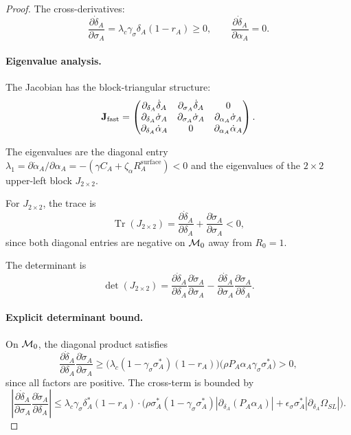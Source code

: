 \begin{proof}
The cross-derivatives:
\[
\frac{\partial \dot{\delta}_A}{\partial \sigma_A}
= \lambda_c \gamma_\sigma \delta_A (1 - r_A) \geq 0,
\qquad
\frac{\partial \dot{\delta}_A}{\partial \alpha_A} = 0.
\]

\paragraph{Eigenvalue analysis.}
The Jacobian has the block-triangular structure:
\[
\mathbf{J}_{\mathrm{fast}} =
\begin{pmatrix}
\partial_{\delta_A} \dot{\delta}_A & \partial_{\sigma_A} \dot{\delta}_A & 0 \\
\partial_{\delta_A} \dot{\sigma}_A & \partial_{\sigma_A} \dot{\sigma}_A & \partial_{\alpha_A} \dot{\sigma}_A \\
\partial_{\delta_A} \dot{\alpha}_A & 0 & \partial_{\alpha_A} \dot{\alpha}_A
\end{pmatrix}.
\]

The eigenvalues are the diagonal entry $\lambda_1 = \partial \dot{\alpha}_A / \partial \alpha_A = -(\gamma C_A + \zeta_\alpha R_A^{\mathrm{surface}}) < 0$ and the eigenvalues of the $2 \times 2$ upper-left block $J_{2\times2}$.

For $J_{2\times2}$, the trace is
\[
\operatorname{Tr}(J_{2\times2})
= \frac{\partial \dot{\delta}_A}{\partial \delta_A}
+ \frac{\partial \dot{\sigma}_A}{\partial \sigma_A} < 0,
\]
since both diagonal entries are negative on $\mathcal{M}_0$ away from $R_0=1$.

The determinant is
\[
\det(J_{2\times2})
= \frac{\partial \dot{\delta}_A}{\partial \delta_A}
   \frac{\partial \dot{\sigma}_A}{\partial \sigma_A}
 - \frac{\partial \dot{\delta}_A}{\partial \sigma_A}
   \frac{\partial \dot{\sigma}_A}{\partial \delta_A}.
\]

\paragraph{Explicit determinant bound.}
On $\mathcal{M}_0$, the diagonal product satisfies
\[
\frac{\partial \dot{\delta}_A}{\partial \delta_A}
\frac{\partial \dot{\sigma}_A}{\partial \sigma_A}
\geq \bigl(\lambda_c (1 - \gamma_\sigma \sigma_A^*)(1 - r_A) \bigr)
      \bigl(\rho P_A \alpha_A \gamma_\sigma \sigma_A^* \bigr)
> 0,
\]
since all factors are positive. The cross-term is bounded by
\[
\left|\frac{\partial \dot{\delta}_A}{\partial \sigma_A}
      \frac{\partial \dot{\sigma}_A}{\partial \delta_A}\right|
\leq \lambda_c \gamma_\sigma \delta_A^* (1 - r_A)
      \cdot \bigl( \rho \sigma_A^* (1 - \gamma_\sigma \sigma_A^*) |\partial_{\delta_A}(P_A\alpha_A)|
                 + \epsilon_\sigma \sigma_A^* |\partial_{\delta_A} \Omega_{SL}| \bigr).
\]


\end{proof}
